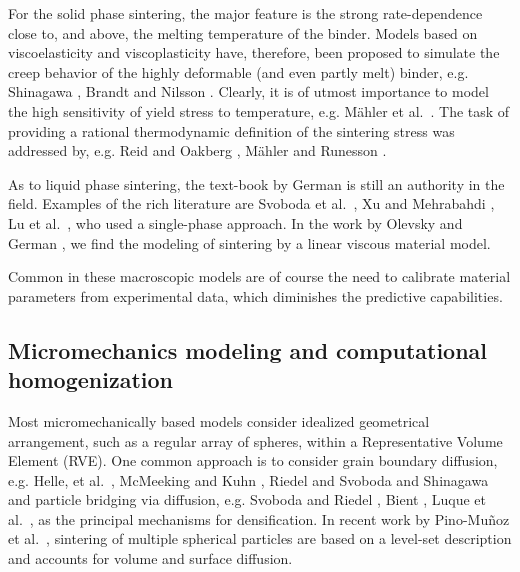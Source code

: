 \documentclass[MikaelDissertation.tex]{subfiles}
\begin{document}
For the solid phase sintering, the major feature is the strong rate-dependence close to, and above, the melting temperature of the binder.
Models based on viscoelasticity and viscoplasticity have, therefore, been proposed to simulate the creep behavior of the highly deformable (and even partly melt) binder, e.g. Shinagawa \cite{shinagawa_finite_1996}, Brandt and Nilsson \cite{brandt_fe-simulation_1998}.
Clearly, it is of utmost importance to model the high sensitivity of yield stress to temperature, e.g. Mähler et al.\ \cite{mahler_modelling_2000}.
The task of providing a rational thermodynamic definition of the sintering stress was addressed by, e.g. Reid and Oakberg \cite{reid_continuum_1990}, Mähler and Runesson \cite{mahler_constitutive_2003}.

As to liquid phase sintering, the text-book by German \cite{german_sintering_1996} is still an authority in the field.
Examples of the rich literature are Svoboda et al.\ \cite{svoboda_model_1996}, Xu and Mehrabahdi \cite{xu_micromechanical_1997}, Lu et al.\ \cite{lu_porosity_2001}, who used a single-phase approach.
In the work by Olevsky and German \cite{olevsky_theory_1998}, \cite{olevsky_effect_2000} we find the modeling of sintering by a linear viscous material model.

Common in these macroscopic models are of course the need to calibrate material parameters from experimental data, which diminishes the predictive capabilities.


\subsection{Micromechanics modeling and computational homogenization}

Most micromechanically based models consider idealized geometrical arrangement, such as a regular array of spheres, within a Representative Volume Element (RVE).
One common approach is to consider grain boundary diffusion, e.g. Helle, et al.\ \cite{helle_hot-isostatic_1985}, McMeeking and Kuhn \cite{mcmeeking_diffusional_1992}, Riedel and Svoboda \cite{riedel_theoretical_1993} and Shinagawa \cite{shinagawa_finite_1996} and particle bridging via diffusion, e.g. Svoboda and Riedel \cite{svoboda_new_1995}, Bient \cite{bient_modeling_2004}, Luque et al.\ \cite{luque_simulation_2005}, as the principal mechanisms for densification.
In recent work by Pino-Muñoz et al.\ \cite{pino_munoz_direct_2013}, sintering of multiple spherical particles are based on a level-set description and accounts for volume and surface diffusion.
\end{document}
